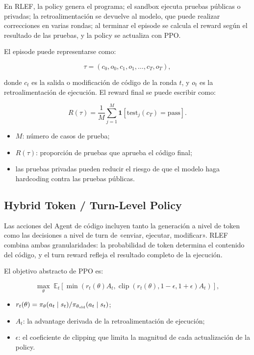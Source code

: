 \documentclass[a4paper]{article}
\begin{document}
En RLEF, la policy genera el programa; el sandbox ejecuta pruebas públicas o privadas; la retroalimentación se devuelve al modelo, que puede realizar correcciones en varias rondas; al terminar el episode se calcula el reward según el resultado de las pruebas, y la policy se actualiza con PPO.


El episode puede representarse como:

$$
\tau=(c_0,o_0,c_1,o_1,\ldots,c_T,o_T),
$$

donde $c_t$ es la salida o modificación de código de la ronda $t$, y $o_t$ es la retroalimentación de ejecución. El reward final se puede escribir como:

$$
R(\tau)=\frac{1}{M}\sum_{j=1}^{M}\mathbf 1[\mathrm{test}_j(c_T)=\mathrm{pass}].
$$

\begin{itemize}
    \item $M$: número de casos de prueba;
    \item $R(\tau)$: proporción de pruebas que aprueba el código final;
    \item las pruebas privadas pueden reducir el riesgo de que el modelo haga hardcoding contra las pruebas públicas.
\end{itemize}

\subsection{Hybrid Token / Turn-Level Policy}

Las acciones del Agent de código incluyen tanto la generación a nivel de token como las decisiones a nivel de turn de «enviar, ejecutar, modificar». RLEF combina ambas granularidades: la probabilidad de token determina el contenido del código, y el turn reward refleja el resultado completo de la ejecución.


El objetivo abstracto de PPO es:

$$
\max_\theta\;\mathbb E_t\left[
\min\left(r_t(\theta)A_t,
\operatorname{clip}(r_t(\theta),1-\epsilon,1+\epsilon)A_t\right)
\right],
$$

\begin{itemize}
    \item $r_t(\theta)=\pi_\theta(a_t\mid s_t)/\pi_{\theta_{\rm old}}(a_t\mid s_t)$;
    \item $A_t$: la advantage derivada de la retroalimentación de ejecución;
    \item $\epsilon$: el coeficiente de clipping que limita la magnitud de cada actualización de la policy.
\end{itemize}
\end{document}
